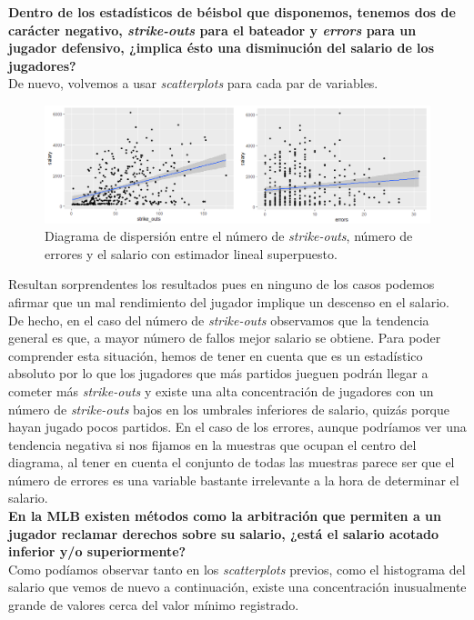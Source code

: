 \documentclass[a4paper,12pt, oneside]{book}
\begin{document}
\textbf{Dentro de los estadísticos de béisbol que disponemos, tenemos dos de carácter negativo, \textit{strike-outs} para el bateador y \textit{errors} para un jugador defensivo, ¿implica ésto una disminución del salario de los jugadores?}\\

De nuevo, volvemos a usar \textit{scatterplots} para cada par de variables.

\begin{figure}[H]
\centering
\includegraphics[scale=0.5]{images/strikeouts_errors.png}
\caption{Diagrama de dispersión entre el número de \textit{strike-outs}, número de errores y el salario con estimador lineal superpuesto.}
\label{homerunsalary}
\end{figure}

Resultan sorprendentes los resultados pues en ninguno de los casos podemos afirmar que un mal rendimiento del jugador implique un descenso en el salario. De hecho, en el caso del número de \textit{strike-outs} observamos que la tendencia general es que, a mayor número de fallos mejor salario se obtiene. Para poder comprender esta situación, hemos de tener en cuenta que es un estadístico absoluto por lo que los jugadores que más partidos jueguen podrán llegar a cometer más \textit{strike-outs} y existe una alta concentración de jugadores con un número de \textit{strike-outs} bajos en los umbrales inferiores de salario, quizás porque hayan jugado pocos partidos. En el caso de los errores, aunque podríamos ver una tendencia negativa si nos fijamos en la muestras que ocupan el centro del diagrama, al tener en cuenta el conjunto de todas las muestras parece ser que el número de errores es una variable bastante irrelevante a la hora de determinar el salario. \\

\textbf{En la MLB existen métodos como la arbitración que permiten a un jugador reclamar derechos sobre su salario, ¿está el salario acotado inferior y/o superiormente?}\\

Como podíamos observar tanto en los \textit{scatterplots} previos, como el histograma del salario que vemos de nuevo a continuación, existe una concentración inusualmente grande de valores cerca del valor mínimo registrado. \\
\end{document}
